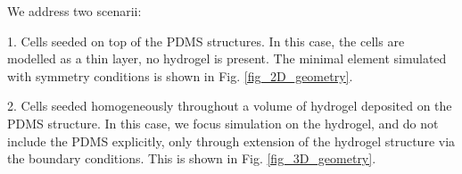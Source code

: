 \documentclass[11pt]{amsart}
\begin{document}
\begin{figure}
\end{figure}

We address two scenarii:

1. Cells seeded on top of the PDMS structures. In this case, the cells are modelled as a thin layer, no hydrogel is present. The minimal element simulated with symmetry conditions is shown in Fig. \ref{fig_2D_geometry}.


2. Cells seeded homogeneously throughout a volume of hydrogel deposited on the PDMS structure. In this case, we focus simulation on the hydrogel, and do not include the PDMS explicitly, only through extension of the hydrogel structure via the boundary conditions.  This is shown in Fig. \ref{fig_3D_geometry}.
\end{document}
